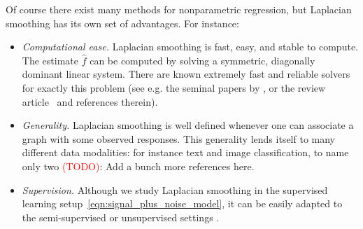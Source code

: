 \documentclass[twoside]{article}
\newcommand{\1}{\mathbf{1}}
\newcommand{\wh}[1]{\widehat{#1}}
\theoremstyle{definition}
\theoremstyle{remark}
\begin{document}
Of course there exist many methods for nonparametric regression, but Laplacian smoothing has its own set of advantages. For instance:
\begin{itemize}
	\item \emph{Computational ease.} Laplacian smoothing is fast, easy, and stable to compute. The estimate $\wh{f}$ can be computed by solving a symmetric, diagonally dominant linear system. There are known extremely fast and reliable solvers for exactly this problem (see e.g. the seminal papers by \cite{spielman2011,spielman2013,spielman2014}, or the review article~\cite{vishnoi2012} and references therein).
	\item \emph{Generality.} Laplacian smoothing is well defined whenever one can associate a graph with some observed responses. This generality lends itself to many different data modalities: for instance text and image classification, to name only two \citep{kondor2002, belkin03a,belkin2006} \textcolor{red}{(TODO)}: Add a bunch more references here.
	\item \emph{Supervision.} Although we study Laplacian smoothing in the supervised learning setup~\eqref{eqn:signal_plus_noise_model}, it can be easily adapted to the semi-supervised or unsupervised settings \citep{nadler09,slepcev17,dunlop2020,calder2019b}.
\end{itemize}
\end{document}
